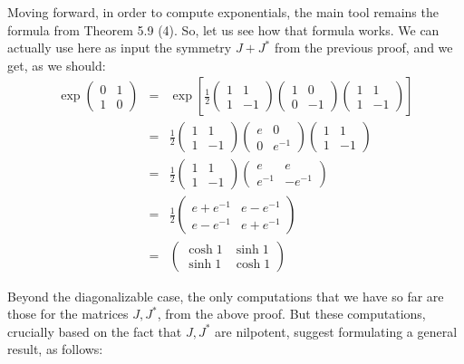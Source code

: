 \documentclass[12pt]{amsbook}
\begin{document}
Moving forward, in order to compute exponentials, the main tool remains the formula from Theorem 5.9 (4). So, let us see how that formula works. We can actually use here as input the symmetry $J+J^*$ from the previous proof, and we get, as we should:
\begin{eqnarray*}
\exp\begin{pmatrix}0&1\\1&0\end{pmatrix}
&=&\exp\left[\frac{1}{2}
\begin{pmatrix}1&1\\1&-1\end{pmatrix}
\begin{pmatrix}1&0\\0&-1\end{pmatrix}
\begin{pmatrix}1&1\\1&-1\end{pmatrix}\right]\\
&=&\frac{1}{2}
\begin{pmatrix}1&1\\1&-1\end{pmatrix}
\begin{pmatrix}e&0\\0&e^{-1}\end{pmatrix}
\begin{pmatrix}1&1\\1&-1\end{pmatrix}\\
&=&\frac{1}{2}
\begin{pmatrix}1&1\\1&-1\end{pmatrix}
\begin{pmatrix}e&e\\e^{-1}&-e^{-1}\end{pmatrix}\\
&=&\frac{1}{2}
\begin{pmatrix}e+e^{-1}&e-e^{-1}\\e-e^{-1}&e+e^{-1}\end{pmatrix}\\
&=&\begin{pmatrix}\cosh 1&\sinh 1\\ \sinh 1&\cosh 1\end{pmatrix}
\end{eqnarray*}

Beyond the diagonalizable case, the only computations that we have so far are those for the matrices $J,J^*$, from the above proof. But these computations, crucially based on the fact that $J,J^*$ are nilpotent, suggest formulating a general result, as follows:
\end{document}
